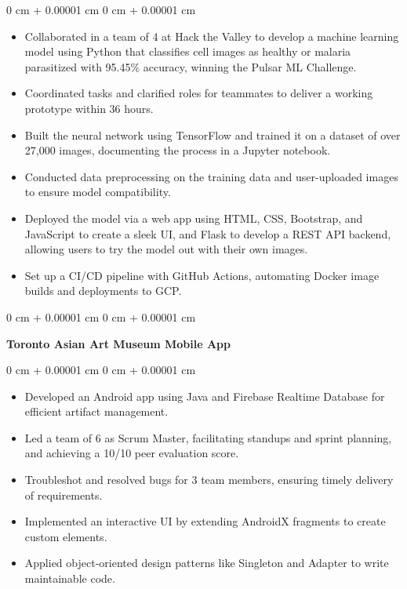 \documentclass[10pt, letterpaper]{article}
\newenvironment{highlights}{
    \begin{itemize}[
        topsep=0.10 cm,
        parsep=0.10 cm,
        partopsep=0pt,
        itemsep=0pt,
        leftmargin=0 cm + 10pt
    ]
}{
    \end{itemize}
} %
\newenvironment{onecolentry}{
    \begin{adjustwidth}{
        0 cm + 0.00001 cm
    }{
        0 cm + 0.00001 cm
    }
}{
    \end{adjustwidth}
} %
\newenvironment{twocolentry}[2][]{
    \onecolentry
    \def\secondColumn{#2}
    \setcolumnwidth{\fill, 4.5 cm}
    \begin{paracol}{2}
}{
    \switchcolumn \raggedleft \secondColumn
    \end{paracol}
    \endonecolentry
} %
\let\hrefWithoutArrow\href
\renewcommand{\href}[2]{\hrefWithoutArrow{#1}{\ifthenelse{\equal{#2}{}}{ }{#2 }\raisebox{.15ex}{\footnotesize \faExternalLink*}}}
\begin{document}
        \vspace{0.10 cm}
        \begin{onecolentry}
            \begin{highlights}
                \item Collaborated in a team of 4 at Hack the Valley to develop a machine learning model using Python that classifies cell images as healthy or malaria parasitized with 95.45\% accuracy, winning the Pulsar ML Challenge.
                \item Coordinated tasks and clarified roles for teammates to deliver a working prototype within 36 hours.
                \item Built the neural network using TensorFlow and trained it on a dataset of over 27,000 images, documenting the process in a Jupyter notebook.
                \item Conducted data preprocessing on the training data and user-uploaded images to ensure model compatibility.
                \item Deployed the model via a web app using HTML, CSS, Bootstrap, and JavaScript to create a sleek UI, and Flask to develop a REST API backend, allowing users to try the model out with their own images.
                \item Set up a CI/CD pipeline with GitHub Actions, automating Docker image builds and deployments to GCP.
            \end{highlights}
        \end{onecolentry}


        \vspace{0.2 cm}

        \begin{twocolentry}{
            \href{https://github.com/BrookMaoDev/SoftwareDesignFinalProject}{Link to Project}
        }
            \textbf{Toronto Asian Art Museum Mobile App}\end{twocolentry}

        \vspace{0.10 cm}
        \begin{onecolentry}
            \begin{highlights}
                \item Developed an Android app using Java and Firebase Realtime Database for efficient artifact management.
                \item Led a team of 6 as Scrum Master, facilitating standups and sprint planning, and achieving a 10/10 peer evaluation score.
                \item Troubleshot and resolved bugs for 3 team members, ensuring timely delivery of requirements.
                \item Implemented an interactive UI by extending AndroidX fragments to create custom elements.
                \item Applied object-oriented design patterns like Singleton and Adapter to write maintainable code.
            \end{highlights}
        \end{onecolentry}
\end{document}
